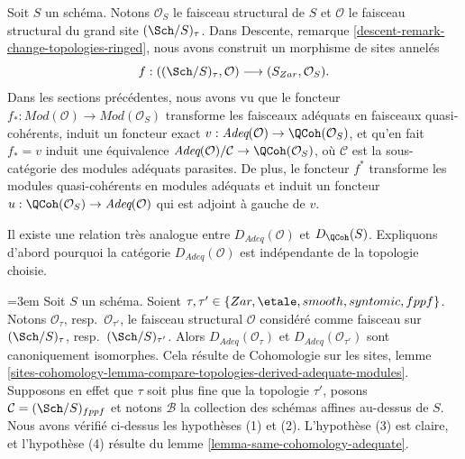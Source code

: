 \noindent
Soit $S$ un schéma. Notons $\mathcal{O}_S$ le faisceau structural de $S$
et $\mathcal{O}$ le faisceau structural du grand site $(\Sch/S)_\tau$.
Dans
Descente, remarque \ref{descent-remark-change-topologies-ringed},
nous avons construit un morphisme de sites annelés
\begin{equation}
\label{equation-compare-big-small}
f :
((\Sch/S)_\tau, \mathcal{O})
\longrightarrow
(S_{Zar}, \mathcal{O}_S).
\end{equation}
Dans les sections précédentes, nous avons vu que le foncteur
$f_* : \textit{Mod}(\mathcal{O}) \to \textit{Mod}(\mathcal{O}_S)$
transforme les faisceaux adéquats en faisceaux quasi-cohérents,
induit un foncteur exact
$v : \textit{Adeq}(\mathcal{O}) \to \QCoh(\mathcal{O}_S)$, et
qu'en fait $f_* = v$ induit une équivalence
$\textit{Adeq}(\mathcal{O})/\mathcal{C} \to \QCoh(\mathcal{O}_S)$,
où $\mathcal{C}$ est la sous-catégorie des modules adéquats parasites.
De plus, le foncteur $f^*$ transforme les modules quasi-cohérents
en modules adéquats et induit un foncteur
$u : \QCoh(\mathcal{O}_S) \to \textit{Adeq}(\mathcal{O})$
qui est adjoint à gauche de $v$.

\medskip\noindent
Il existe une relation très analogue entre
$D_{\textit{Adeq}}(\mathcal{O})$ et $D_\QCoh(S)$.
Expliquons d'abord pourquoi la catégorie $D_{\textit{Adeq}}(\mathcal{O})$
est indépendante de la topologie choisie.

\begin{remark}
\label{remark-D-adeq-independence-topology}
{\emergencystretch=3em
Soit $S$ un schéma.
Soient $\tau, \tau' \in \{Zar, \etale, smooth, syntomic, fppf\}$.
Notons $\mathcal{O}_\tau$, resp.\ $\mathcal{O}_{\tau'}$,
le faisceau structural $\mathcal{O}$ considéré comme faisceau sur
$(\Sch/S)_\tau$, resp.\ $(\Sch/S)_{\tau'}$.
Alors $D_{\textit{Adeq}}(\mathcal{O}_\tau)$ et
$D_{\textit{Adeq}}(\mathcal{O}_{\tau'})$ sont canoniquement isomorphes.
Cela résulte de Cohomologie sur les sites, lemme
\ref{sites-cohomology-lemma-compare-topologies-derived-adequate-modules}.
Supposons en effet que $\tau$ soit plus fine que la topologie $\tau'$, posons
$\mathcal{C} = (\Sch/S)_{fppf}$ et notons $\mathcal{B}$ la collection
des schémas affines au-dessus de $S$. Nous avons vérifié ci-dessus les hypothèses (1) et (2).
L'hypothèse (3) est claire, et l'hypothèse (4) résulte du
lemme \ref{lemma-same-cohomology-adequate}.\par}
\end{remark}

